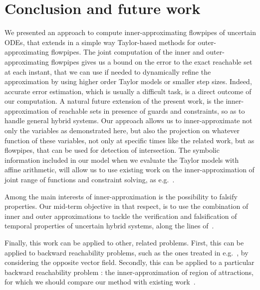 \documentclass{sig-alternate-05-2015}
\begin{document}
\section{Conclusion and future work}
%
We presented an approach to compute inner-approxima\-ting flowpipes of uncertain ODEs, that extends in a simple way Taylor-based 
methods for outer-approximating flowpipes. %
The joint computation of the inner and outer-approximating flowpipes gives us a bound on the error to the exact reachable 
set at each instant, that we can use if needed to dynamically refine the approximation by using higher order Taylor models or smaller step sizes. 
Indeed, accurate error estimation, which is usually a difficult task, is a direct outcome of our computation.
A natural future extension of the present work, is the inner-approximation of reachable sets 
in presence of guards and constraints, so as to handle general hybrid systems. Our approach allows us to inner-approximate 
not only the variables as demonstrated here, but also the projection on whatever function of these variables, not only at 
specific times like the related work, but as flowpipes, that can be used for detection of intersection. 
The symbolic information included in our model  when we evaluate the Taylor models with affine arithmetic, 
will allow us to use existing work on the inner-approximation 
of joint range of functions and constraint solving, as e.g.~\cite{DBLP:journals/constraints/IshiiGJ12}.  

Among the main interests of inner-approximation is the possibility to falsify properties. Our mid-term objective in that respect, 
is to use the combination of inner and outer approximations to tackle the verification and falsification of temporal properties
of uncertain hybrid systems, along the lines of~\cite{falsification2,IshiiYG16}. 


Finally, this work can be applied to other, related problems. First, this can be applied
to backward reachability problems, such as the ones treated in e.g.~\cite{underapprox16}, by considering
the opposite vector field. Secondly, this can be applied to a particular backward 
reachability problem : the inner-approximation of region
of attractions, for which we should compare our method with existing work~\cite{DBLP:conf/nolcos/KordaHJ13}. 
\end{document}
